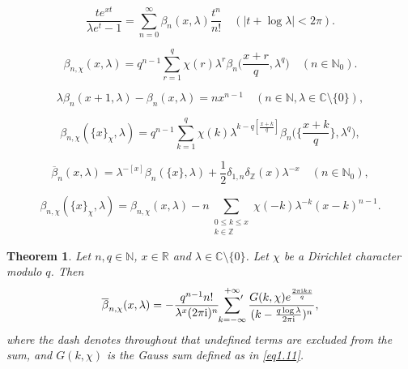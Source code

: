 \documentclass[10pt,a4paper]{amsart}
\newtheorem{theorem}{Theorem}
\begin{document}
\begin{equation}  \label{eq1.15}
\frac{te^{xt}}{\lambda e^{t}-1}=\sum_{n=0}^{\infty}
\beta_{n}(x,\lambda)\frac{t^{n}}{n!}\quad(|t+\log\lambda|<2\pi).
\end{equation}

\begin{equation}\label{eq2.5}
\beta_{n,\chi}(x,\lambda)=q^{n-1}\sum_{r=1}^{q}\chi(r)\lambda^{r}\beta_{n}\biggl(\frac{x+r}{q},\lambda^{q}\biggl)\quad(n\in\mathbb{N}_{0}).
\end{equation}

\begin{equation}\label{eq2.16}
\lambda\beta_{n}(x+1,\lambda)-\beta_{n}(x,\lambda)=nx^{n-1}\quad(n\in\mathbb{N},\lambda\in\mathbb{C}\setminus\{0\}),
\end{equation}

\begin{equation}\label{eq2.34}
\beta_{n,\chi}(\{x\}_{\chi},\lambda)=q^{n-1}\sum_{k=1}^{q}\chi(k)\lambda^{k-q[\frac{x+k}{q}]}\beta_{n}\biggl(\biggl\{\frac{x+k}{q}\biggl\},\lambda^{q}\biggl),
\end{equation}

\begin{equation}\label{eq2.35}
\overline{\beta}_{n}(x,\lambda)=\lambda^{-[x]}\beta_{n}(\{x\},\lambda)+\frac{1}{2}\delta_{1,n}\delta_{\mathbb{Z}}(x)\lambda^{-x}\quad(n\in\mathbb{N}_{0}),
\end{equation}

\begin{equation}\label{eq2.40}
\beta_{n,\chi}(\{x\}_{\chi},\lambda)=\beta_{n,\chi}(x,\lambda)-n\underset{\substack{0\leqslant k\leqslant x\\ k\in\mathbb{Z}}}{\sum}\chi(-k)\lambda^{-k}(x-k)^{n-1}.
\end{equation}

\begin{theorem}\label{thm3.1} Let $n,q\in\mathbb{N}$, $x\in\mathbb{R}$ and $\lambda\in\mathbb{C}\setminus\{0\}$. Let $\chi$ be a Dirichlet character modulo $q$. Then
\begin{equation}\label{eq3.1}
\overline{\beta}_{n,\chi}(x,\lambda)=-\frac{q^{n-1}n!}{\lambda^{x}(2\pi \mathrm{i})^{n}}\sideset{}{'}\sum_{k=-\infty}^{+\infty}\frac{G(k,\chi)e^{\frac{2\pi\mathrm{i}kx}{q}}}{(k-\frac{q\log\lambda}{2\pi\mathrm{i}})^{n}},
\end{equation}
where the dash denotes throughout that undefined terms are excluded from the
sum, and $G(k,\chi)$ is the Gauss sum defined as in \eqref{eq1.11}.
\end{theorem}
\end{document}
